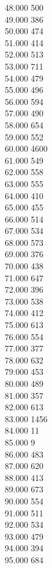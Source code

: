 { 48.000	500 \\
 49.000	386 \\
 50.000	474 \\
 51.000	414 \\
 52.000	513 \\
 53.000	711 \\
 54.000	479 \\
 55.000	496 \\
 56.000	594 \\
 57.000	490 \\
 58.000	654 \\
 59.000	552 \\
 60.000	4600 \\
 61.000	549 \\
 62.000	558 \\
 63.000	555 \\
 64.000	410 \\
 65.000	455 \\
 66.000	514 \\
 67.000	534 \\
 68.000	573 \\
 69.000	376 \\
 70.000	438 \\
 71.000	647 \\
 72.000	396 \\
 73.000	538 \\
 74.000	412 \\
 75.000	613 \\
 76.000	554 \\
 77.000	377 \\
 78.000	632 \\
 79.000	453 \\
 80.000	489 \\
 81.000	357 \\
 82.000	613 \\
 83.000	1456 \\
 84.000	11 \\
 85.000	9 \\
 86.000	483 \\
 87.000	620 \\
 88.000	413 \\
 89.000	673 \\
 90.000	554 \\
 91.000	511 \\
 92.000	534 \\
 93.000	479 \\
 94.000	394 \\
 95.000	684 \\
}
